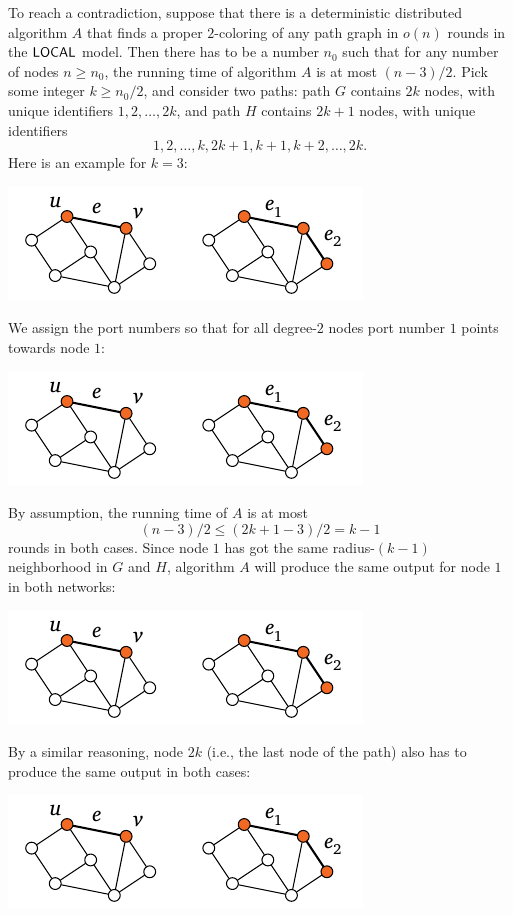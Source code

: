 To reach a contradiction, suppose that there is a deterministic distributed algorithm $A$ that finds a proper $2$-coloring of any path graph in $o(n)$ rounds in the $\textup{\sffamily LOCAL}$ model. Then there has to be a number $n_0$ such that for any number of nodes $n \ge n_0$, the running time of algorithm $A$ is at most $(n-3)/2$. Pick some integer $k \ge n_0/2$, and consider two paths: path $G$ contains $2k$ nodes, with unique identifiers $1,2,\dotsc,2k$, and path $H$ contains $2k+1$ nodes, with unique identifiers \[1,2,\dotsc,k,2k+1,k+1,k+2,\dotsc,2k.\] Here is an example for $k = 3$:
\begin{center}
    \includegraphics[page=\PIntroLbTwoA]{figs.pdf}
\end{center}
We assign the port numbers so that for all degree-$2$ nodes port number $1$ points towards node $1$:
\begin{center}
    \includegraphics[page=\PIntroLbTwoPN]{figs.pdf}
\end{center}
By assumption, the running time of $A$ is at most
\[
    (n-3)/2 \le (2k+1-3)/2 = k-1
\]
rounds in both cases. Since node $1$ has got the same radius-${(k-1)}$ neighborhood in $G$ and $H$, algorithm $A$ will produce the same output for node $1$ in both networks:
\begin{center}
    \includegraphics[page=\PIntroLbTwoB]{figs.pdf}
\end{center}
By a similar reasoning, node $2k$ (i.e., the last node of the path) also has to produce the same output in both cases:
\begin{center}
    \includegraphics[page=\PIntroLbTwoC]{figs.pdf}
\end{center}

